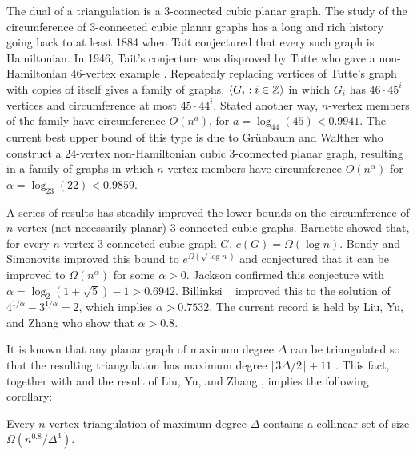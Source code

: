 \documentclass[a4paper,UKenglish]{socg-lipics-v2019}
\begin{document}
The dual of a triangulation is a 3-connected cubic planar graph.
The study of the circumference of 3-connected cubic planar graphs
has a long and rich history going back to at least 1884 when Tait
\cite{tait:remarks} conjectured that every such graph is Hamiltonian.  In
1946, Tait's conjecture was disproved by Tutte who gave a non-Hamiltonian
46-vertex example \cite{tutte:on}.  Repeatedly replacing vertices of
Tutte's graph with copies of itself gives a family of graphs, $\langle G_i:i\in
\mathbb{Z}\rangle$ in which $G_i$ has $46\cdot 45^i$ vertices and circumference at
most $45\cdot44^i$.  Stated another way, $n$-vertex members of the
family have circumference $O(n^a)$, for $a=\log_{44}(45) < 0.9941$.
The current best upper bound of this type is due to Gr\"unbaum and
Walther \cite{grunbaum.walther:shortness} who construct a 24-vertex
non-Hamiltonian cubic 3-connected planar graph, resulting in a family
of graphs in which $n$-vertex members have circumference $O(n^{\alpha})$
for $\alpha=\log_{23}(22)< 0.9859$.

A series of results has steadily improved the lower bounds on the
circumference of $n$-vertex  (not necessarily planar) 3-connected
cubic graphs.  Barnette \cite{barnette:trees} showed that, for
every $n$-vertex 3-connected cubic graph $G$, $c(G)=\Omega(\log n)$.
Bondy and Simonovits \cite{bondy.simonovits:longest} improved this bound
to $e^{\Omega(\sqrt{\log n})}$ and conjectured that it can be improved
to $\Omega(n^\alpha)$ for some $\alpha>0$.  Jackson \cite{jackson:longest}
confirmed this conjecture with $\alpha=\log_2(1+\sqrt{5})-1 > 0.6942$.
Billinksi \etal\ \cite{bilinksi.jackson.ea:circumference} improved
this to the solution of $4^{1/\alpha}-3^{1/\alpha}=2$, which implies
$\alpha>0.7532$.  The current record is held by Liu, Yu, and Zhang
\cite{liu.yu.zhang:circumference} who show that $\alpha>0.8$.  

It is known that any planar graph of maximum degree $\Delta$ can be
triangulated so that the resulting triangulation has maximum degree
$\lceil 3\Delta/2\rceil+11$ \cite{kant.bodlaender:triangulating}. This
fact, together with  and the result of Liu, Yu, and Zhang
\cite{liu.yu.zhang:circumference}, implies the following corollary:

\begin{cor}
  Every $n$-vertex triangulation of maximum degree $\Delta$ contains a
  collinear set of size $\Omega(n^{0.8}/\Delta^4)$.
\end{cor}

\end{document}
